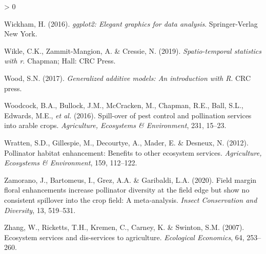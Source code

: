 \documentclass[]{elsarticle} %
\newlength{\cslhangindent}
\newenvironment{CSLReferences}[2] %
 {%
  \setlength{\parindent}{0pt}
  \ifodd #1 \everypar{\setlength{\hangindent}{\cslhangindent}}\ignorespaces\fi
  \ifnum #2 > 0
  \setlength{\parskip}{#2\baselineskip}
  \fi
 }%
 {}
\begin{document}
\begin{CSLReferences}{1}{0}
\leavevmode\hypertarget{ref-wickham2016}{}%
Wickham, H. (2016). \emph{{ggplot2}: Elegant graphics for data analysis}. Springer-Verlag New York.

\leavevmode\hypertarget{ref-wickle2019}{}%
Wikle, C.K., Zammit-Mangion, A. \& Cressie, N. (2019). \emph{Spatio-temporal statistics with r}. Chapman; Hall: CRC Press.

\leavevmode\hypertarget{ref-wood2017}{}%
Wood, S.N. (2017). \emph{Generalized additive models: An introduction with {R}}. CRC press.

\leavevmode\hypertarget{ref-woodcock2016}{}%
Woodcock, B.A., Bullock, J.M., McCracken, M., Chapman, R.E., Ball, S.L., Edwards, M.E., \emph{et al.} (2016). Spill-over of pest control and pollination services into arable crops. \emph{Agriculture, Ecosystems \& Environment}, 231, 15--23.

\leavevmode\hypertarget{ref-wratten2012}{}%
Wratten, S.D., Gillespie, M., Decourtye, A., Mader, E. \& Desneux, N. (2012). Pollinator habitat enhancement: Benefits to other ecosystem services. \emph{Agriculture, Ecosystems {\&} Environment}, 159, 112--122.

\leavevmode\hypertarget{ref-zamorano2020}{}%
Zamorano, J., Bartomeus, I., Grez, A.A. \& Garibaldi, L.A. (2020). Field margin floral enhancements increase pollinator diversity at the field edge but show no consistent spillover into the crop field: A meta-analysis. \emph{Insect Conservation and Diversity}, 13, 519--531.

\leavevmode\hypertarget{ref-zhang2007}{}%
Zhang, W., Ricketts, T.H., Kremen, C., Carney, K. \& Swinton, S.M. (2007). Ecosystem services and dis-services to agriculture. \emph{Ecological Economics}, 64, 253--260.

\end{CSLReferences}
\end{document}
